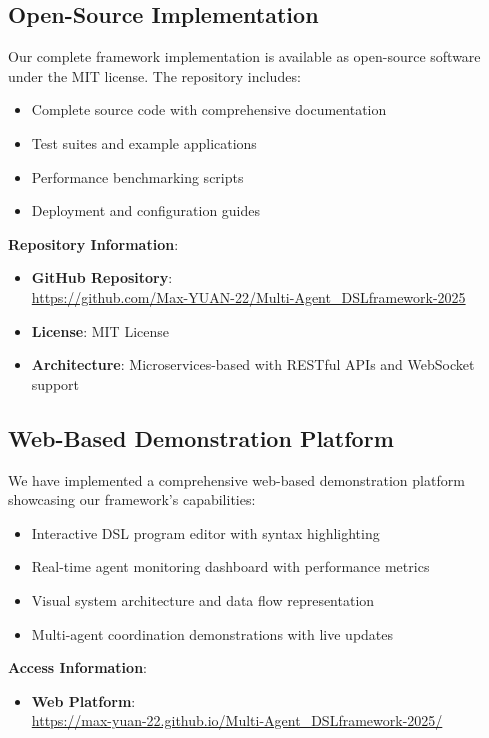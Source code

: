 \documentclass[conference]{IEEEtran}
\begin{document}
\subsection{Open-Source Implementation}

Our complete framework implementation is available as open-source software under the MIT license. The repository includes:

\begin{itemize}
\item Complete source code with comprehensive documentation
\item Test suites and example applications
\item Performance benchmarking scripts
\item Deployment and configuration guides
\end{itemize}

\textbf{Repository Information}:
\begin{itemize}
\item \textbf{GitHub Repository}: \\
\href{https://github.com/Max-YUAN-22/Multi-Agent_DSLframework-2025}{https://github.com/Max-YUAN-22/Multi-Agent\_DSLframework-2025}
\item \textbf{License}: MIT License
\item \textbf{Architecture}: Microservices-based with RESTful APIs and WebSocket support
\end{itemize}

\subsection{Web-Based Demonstration Platform}

We have implemented a comprehensive web-based demonstration platform showcasing our framework's capabilities:

\begin{itemize}
\item Interactive DSL program editor with syntax highlighting
\item Real-time agent monitoring dashboard with performance metrics~\cite{zhang2025}
\item Visual system architecture and data flow representation
\item Multi-agent coordination demonstrations with live updates
\end{itemize}

\textbf{Access Information}:
\begin{itemize}
\item \textbf{Web Platform}: \\
\href{https://max-yuan-22.github.io/Multi-Agent_DSLframework-2025/}{https://max-yuan-22.github.io/Multi-Agent\_DSLframework-2025/}
\end{itemize}
\end{document}
